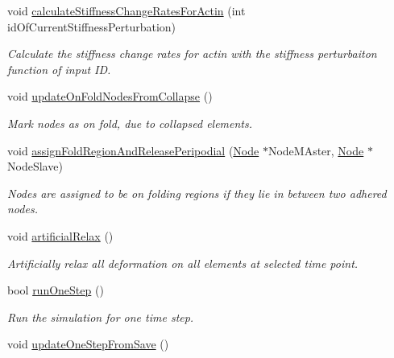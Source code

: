 \begin{DoxyCompactItemize}
void \hyperlink{classSimulation_a8b40b6f71c115d9c566333151219a7d6}{calculate\+Stiffness\+Change\+Rates\+For\+Actin} (int id\+Of\+Current\+Stiffness\+Perturbation)
\begin{DoxyCompactList}\small\item\em Calculate the stiffness change rates for actin with the stiffness perturbaiton function of input I\+D. \end{DoxyCompactList}\item 
void \hyperlink{classSimulation_ae7642cf5d56f38710da9b219e56b3c77}{update\+On\+Fold\+Nodes\+From\+Collapse} ()
\begin{DoxyCompactList}\small\item\em Mark nodes as on fold, due to collapsed elements. \end{DoxyCompactList}\item 
void \hyperlink{classSimulation_a5a12ff087efbc813a949e347da7a0438}{assign\+Fold\+Region\+And\+Release\+Peripodial} (\hyperlink{classNode}{Node} $\ast$Node\+M\+Aster, \hyperlink{classNode}{Node} $\ast$Node\+Slave)
\begin{DoxyCompactList}\small\item\em Nodes are assigned to be on folding regions if they lie in between two adhered nodes. \end{DoxyCompactList}\item 
void \hyperlink{classSimulation_aee92b20e497b42f5b7a089c3f9409e97}{artificial\+Relax} ()
\begin{DoxyCompactList}\small\item\em Artificially relax all deformation on all elements at selected time point. \end{DoxyCompactList}\item 
bool \hyperlink{classSimulation_a300713fd91c15b51421606bffd6d87b7}{run\+One\+Step} ()
\begin{DoxyCompactList}\small\item\em Run the simulation for one time step. \end{DoxyCompactList}\item 
\hypertarget{classSimulation_a1f5dbbde572af555225089e247296e2e}{}void \hyperlink{classSimulation_a1f5dbbde572af555225089e247296e2e}{update\+One\+Step\+From\+Save} ()\label{classSimulation_a1f5dbbde572af555225089e247296e2e}


\end{DoxyCompactItemize}
